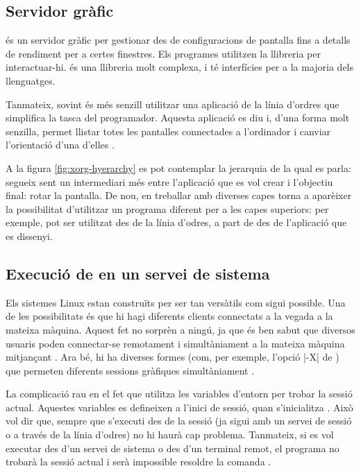 \subsection{Servidor gràfic }

 és un servidor gràfic per gestionar des de configuracions de
pantalla fins a detalls de rendiment per a certes finestres. Els programes
utilitzen la llibreria  per interactuar-hi.
 és una llibreria molt complexa, i té interfícies per a la majoria
dels llenguatges.

Tanmateix, sovint és més senzill utilitzar una aplicació de
la línia d'ordres que simplifica la tasca del programador. Aquesta
aplicació es diu  i, d'una forma molt senzilla, permet llistar
totes les pantalles connectades a l'ordinador i canviar l'orientació
d'una d'elles \cite{Xrandr}.

A la figura \ref{fig:xorg-hyerarchy} es pot contemplar la jerarquia de la qual
es parla:  segueix sent un intermediari més entre l'aplicació que
es vol crear i l'objectiu final: rotar la pantalla. De nou, en treballar amb
diverses capes torna a aparèixer la possibilitat d'utilitzar un programa
diferent per a les capes superiors: per exemple,  pot ser utilitzat
des de la línia d'odres, a part de des de l'aplicació que es dissenyi.



\subsection{Execució de  en un servei de sistema}
\label{subsec:xrandr}

Els sistemes Linux estan construïts per ser tan versàtils com sigui possible. Una
de les possibilitats és que hi hagi diferents clients connectats a la vegada
a la mateixa màquina. Aquest fet no sorprèn a ningú, ja que és ben sabut que
diversos usuaris poden connectar-se remotament i simultàniament a la mateixa
màquina mitjançant . Ara bé, hi ha diverses formes (com, per exemple,
l'opció \ord|-X| de ) que permeten diferents sessions gràfiques
simultàniament \cite{ManSSH}.

La complicació rau en el fet que  utilitza les variables d'entorn per
trobar la sessió actual. Aquestes variables es defineixen a l'inici de sessió,
quan s'inicialitza . Això vol dir que, sempre que s'executi
 des de la sessió (ja sigui amb un servei de sessió o a través de
la línia d'odres) no hi haurà cap problema.
Tanmateix, si es vol executar  des d'un servei de sistema o des d'un
terminal remot, el programa no trobarà la sessió actual i serà impossible
resoldre la comanda \cite{ArchWiki}.

